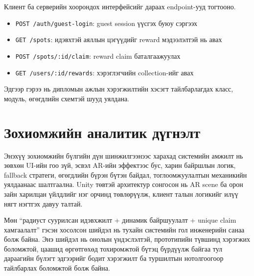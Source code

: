 \begin{sloppy}
Клиент ба серверийн хоорондох интерфейсийг дараах endpoint-ууд тогтооно.

\begin{itemize}
    \item \texttt{POST /auth/guest-login}: guest session үүсгэх буюу сэргээх
    \item \texttt{GET /spots}: идэвхтэй аяллын цэгүүдийг reward мэдээлэлтэй нь авах
    \item \texttt{POST /spots/:id/claim}: reward claim баталгаажуулах
    \item \texttt{GET /users/:id/rewards}: хэрэглэгчийн collection-ийг авах
\end{itemize}

Эдгээр гэрээ нь дипломын ажлын хэрэгжилтийн хэсэгт тайлбарлагдах класс, модуль, өгөгдлийн схемтэй шууд уялдана.

\section{Зохиомжийн аналитик дүгнэлт}

Энэхүү зохиомжийн бүлгийн дүн шинжилгээнээс харахад системийн амжилт нь зөвхөн UI-ийн гоо зүй, эсвэл AR-ийн эффектээс бус, харин байршлын логик, fallback стратеги, өгөгдлийн бүрэн бүтэн байдал, тоглоомжуулалтын механикийн уялдаанаас шалтгаална. Unity төвтэй архитектур сонгосон нь AR scene ба орон зайн харилцан үйлдлийг нэг орчинд төвлөрүүлж, клиент талын логикийг илүү нягт нэгтгэх давуу талтай.

Мөн ``радиуст суурилсан идэвхжилт + динамик байршуулалт + unique claim хамгаалалт'' гэсэн хосолсон шийдэл нь тухайн системийн гол инженерийн санаа болж байна. Энэ шийдэл нь онолын үндэслэлтэй, прототипийн түвшинд хэрэгжих боломжтой, цаашид өргөтгөхөд тохиромжтой бүтэц бүрдүүлж байгаа тул дараагийн бүлэгт эдгээрийг бодит хэрэгжилт ба туршилтын нотолгоогоор тайлбарлах боломжтой болж байна.

\end{sloppy}
